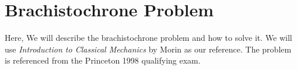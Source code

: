 \documentclass{article}
\begin{document}
\section{Brachistochrone Problem}

Here, We will describe the brachistochrone problem and how to solve it. We will use \textit{Introduction to Classical Mechanics} by Morin as our reference. The problem is referenced from the Princeton 1998 qualifying exam.
\end{document}
